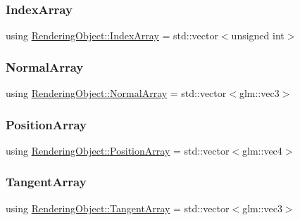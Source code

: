 \hypertarget{class_rendering_object_a9931c88bca3384065c6691dfe1e60af1}{}\label{class_rendering_object_a9931c88bca3384065c6691dfe1e60af1} 
\subsubsection{\texorpdfstring{Index\+Array}{IndexArray}}
{\footnotesize\ttfamily using \hyperlink{class_rendering_object_a9931c88bca3384065c6691dfe1e60af1}{Rendering\+Object\+::\+Index\+Array} =  std\+::vector$<$unsigned int$>$}

\hypertarget{class_rendering_object_a327c4d892de8d6138fb59afa6d078257}{}\label{class_rendering_object_a327c4d892de8d6138fb59afa6d078257} 
\subsubsection{\texorpdfstring{Normal\+Array}{NormalArray}}
{\footnotesize\ttfamily using \hyperlink{class_rendering_object_a327c4d892de8d6138fb59afa6d078257}{Rendering\+Object\+::\+Normal\+Array} =  std\+::vector$<$glm\+::vec3$>$}

\hypertarget{class_rendering_object_a1223b9cf03f2029b9c43d71042c2a18e}{}\label{class_rendering_object_a1223b9cf03f2029b9c43d71042c2a18e} 
\subsubsection{\texorpdfstring{Position\+Array}{PositionArray}}
{\footnotesize\ttfamily using \hyperlink{class_rendering_object_a1223b9cf03f2029b9c43d71042c2a18e}{Rendering\+Object\+::\+Position\+Array} =  std\+::vector$<$glm\+::vec4$>$}

\hypertarget{class_rendering_object_a45b53e911c2f0131aa10e89869d38944}{}\label{class_rendering_object_a45b53e911c2f0131aa10e89869d38944} 
\subsubsection{\texorpdfstring{Tangent\+Array}{TangentArray}}
{\footnotesize\ttfamily using \hyperlink{class_rendering_object_a45b53e911c2f0131aa10e89869d38944}{Rendering\+Object\+::\+Tangent\+Array} =  std\+::vector$<$glm\+::vec3$>$}

